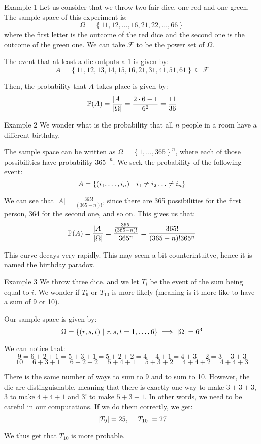 \documentclass[a4paper]{article}
\begin{document}
\begin{parag}{Example 1}
    Let us consider that we throw two fair dice, one red and one green. The sample space of this experiment is:
    \[\Omega = \left\{11, 12, \ldots, 16, 21, 22, \ldots, 66\right\}\]
    where the first letter is the outcome of the red dice and the second one is the outcome of the green one. We can take $\mathcal{F}$ to be the power set of $\Omega$.

    The event that at least a die outputs a 1 is given by: 
    \[A = \left\{11, 12, 13, 14, 15, 16, 21, 31, 41, 51, 61\right\} \subseteq \mathcal{F}\]
    
    Then, the probability that $A$ takes place is given by: 
    \[\prob\left(A\right) = \frac{\left|A\right|}{\left|\Omega\right|} = \frac{2\cdot 6 - 1}{6^2} = \frac{11}{36}\]
\end{parag}

\begin{parag}{Example 2}
    We wonder what is the probability that all $n$ people in a room have a different birthday.

    The sample space can be written as $\Omega = \left\{1, \ldots, 365\right\}^{n}$, where each of those possibilities have probability $365^{-n}$. We seek the probability of the following event: 
    \[A = \left\{\left(i_1, \ldots, i_n\right) \suchthat i_1 \neq i_2 \ldots \neq i_n\right\}\]
    
    We can see that $\left|A\right| = \frac{365!}{\left(365 - n\right)!}$, since there are 365 possibilities for the first person, 364 for the second one, and so on. This gives us that: 
    \[\prob\left(A\right) = \frac{\left|A\right|}{\left|\Omega\right|} = \frac{\frac{365!}{\left(365 - n\right)!}}{365^n} = \frac{365!}{\left(365 - n\right)! 365^n}\]
    
    This curve decays very rapidly. This may seem a bit counterintuitve, hence it is named the birthday paradox.
\end{parag}

\begin{parag}{Example 3}
    We throw three dice, and we let $T_i$ be the event of the sum being equal to $i$. We wonder if $T_9$ or $T_{10}$ is more likely (meaning is it more like to have a sum of 9 or 10).

    Our sample space is given by: 
    \[\Omega = \left\{\left(r, s, t\right) \suchthat r, s, t = 1, \ldots, 6\right\} \implies \left|\Omega\right| = 6^3\]
    
    We can notice that: 
    \[9 = 6 + 2 + 1 = 5 + 3 + 1 = 5 + 2 + 2 = 4 + 4 + 1 = 4 + 3 + 2 = 3 + 3 + 3\]
    \[10 = 6 + 3 + 1 = 6 + 2 + 2 = 5 + 4 + 1 = 5 + 3 + 2 = 4 + 4 + 2 = 4 + 4 + 3\]
    
    There is the same number of ways to sum to 9 and to sum to 10. However, the die are distinguishable, meaning that there is exactly one way to make $3 + 3 + 3$, $3$ to make $4 + 4 + 1$ and $3!$ to make $5 + 3 + 1$. In other words, we need to be careful in our computations. If we do them correctly, we get: 
    \[\left|T_9\right| = 25, \mathspace \left|T_{10}\right| = 27\]
    
    We thus get that $T_{10}$ is more probable.
\end{parag}
\end{document}
